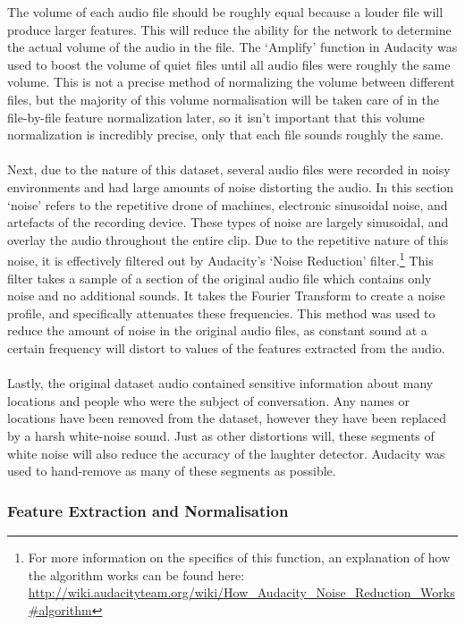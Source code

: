 \documentclass[a4paper,11pt,notitlepage]{article}
\begin{document}
\noindent
The volume of each audio file should be roughly equal because a louder file will produce larger features. This will reduce the ability for the network to determine the actual volume of the audio in the file. The `Amplify' function in Audacity was used to boost the volume of quiet files until all audio files were roughly the same volume. This is not a precise method of normalizing the volume between different files, but the majority of this volume normalisation will be taken care of in the file-by-file feature normalization later, so it isn't important that this volume normalization is incredibly precise, only that each file sounds roughly the same.\\
\\
Next, due to the nature of this dataset, several audio files were recorded in noisy environments and had large amounts of noise distorting the audio. In this section `noise' refers to the repetitive drone of machines, electronic sinusoidal noise, and artefacts of the recording device. These types of noise are largely sinusoidal, and overlay the audio throughout the entire clip. Due to the repetitive nature of this noise, it is effectively filtered out by Audacity's `Noise Reduction' filter.\footnote{For more information on the specifics of this function, an explanation of how the algorithm works can be found here: \url{http://wiki.audacityteam.org/wiki/How_Audacity_Noise_Reduction_Works#algorithm}} This filter takes a sample of a section of the original audio file which contains only noise and no additional sounds. It takes the Fourier Transform to create a noise profile, and specifically attenuates these frequencies. This method was used to reduce the amount of noise in the original audio files, as constant sound at a certain frequency will distort to values of the features extracted from the audio.\\
\\
Lastly, the original dataset audio contained sensitive information about many locations and people who were the subject of conversation. Any names or locations have been removed from the dataset, however they have been replaced by a harsh white-noise sound. Just as other distortions will, these segments of white noise will also reduce the accuracy of the laughter detector.  Audacity was used to hand-remove as many of these segments as possible.

\newpage
\subsubsection{Feature Extraction and Normalisation}
\end{document}
